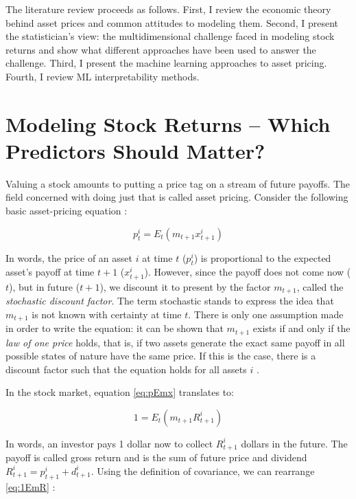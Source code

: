  	The literature review proceeds as follows. First, I review the economic theory behind asset prices and common attitudes to modeling them. Second, I present the statistician's view: the multidimensional challenge faced in modeling stock returns \citep{cochrane2011presidential} and show what different approaches have been used to answer the challenge. Third, I present the machine learning approaches to asset pricing. Fourth, I review ML interpretability methods. 
 	
 	\section{Modeling Stock Returns -- Which Predictors Should Matter?}
 	
	 	Valuing a stock amounts to putting a price tag on a stream of future payoffs. The field concerned with doing just that is called asset pricing. Consider the following basic asset-pricing equation \citep{cochrane2009asset}:
	 	
	 	\begin{equation}
	 		p_t^i = E_t(m_{t+1} x_{t+1}^i ) \label{eq:pEmx}
	 	\end{equation}
	 	
	 	In words, the price of an asset $i$ at time $t$ ($p_t^i$) is proportional to the expected asset's payoff at time $t+1$ ($x_{t+1}^i$). However, since the payoff does not come now ($t$), but in future ($t+1$), we discount it to present by the factor $m_{t+1}$, called the \textit{stochastic discount factor}. The term stochastic stands to express the idea that $m_{t+1}$ is not known with certainty at time $t$. There is only one assumption made in order to write the equation: it can be shown that $m_{t+1}$ exists if and only if the \textit{law of one price} holds, that is, if two assets generate the exact same payoff in all possible states of nature have the same price. If this is the case, there is a discount factor such that the equation holds for all assets $i$ \citep{cochrane2009asset}.
	 	
	 	In the stock market, equation \ref{eq:pEmx} translates to:
	 	
	 	\begin{equation}
	 		1 = E_t(m_{t+1} R_{t+1}^i ) \label{eq:1EmR}
	 	\end{equation} 
	 	
	 	In words, an investor pays 1 dollar now to collect $R_{t+1}^i$ dollars in the future. The payoff is called gross return and is the sum of future price and dividend $R_{t+1}^i = p_{t+1}^i+ d_{t+1}^i$. 
	 	Using the definition of covariance, we can rearrange \ref{eq:1EmR} \citep{cochrane2009asset}:
	 	
